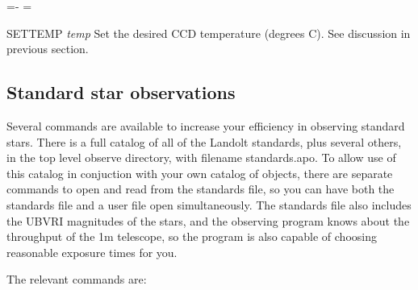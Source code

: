 \documentclass[10pt]{report}
\newenvironment{hanging}{
	\begin{list}{}{
		\labelsep=0pt
		\labelwidth=0pt
		\listparindent=0pt
		\itemindent=-\leftmargini
		\leftmargin=\leftmargini
	}
}{
	\end{list}
}
\begin{document}
\begin{hanging}
%
%
%

\item{SETTEMP} \textit{temp}
Set the desired CCD temperature (degrees C). See discussion in previous
section.

\end{hanging}

\subsection{Standard star observations}

Several commands are available to increase your efficiency in observing
standard stars. There is a full catalog of all of the Landolt standards,
plus several others, in the top level observe directory, with filename
standards.apo. To allow use of this catalog in conjuction with your own
catalog of objects, there are separate commands to open and read from the
standards file, so you can have both the standards file and a user file open
simultaneously. The standards file also includes the UBVRI magnitudes of
the stars, and the observing program knows about the throughput of the
1m telescope, so the program is also capable of choosing reasonable exposure
times for you.

The relevant commands are:
\end{document}
